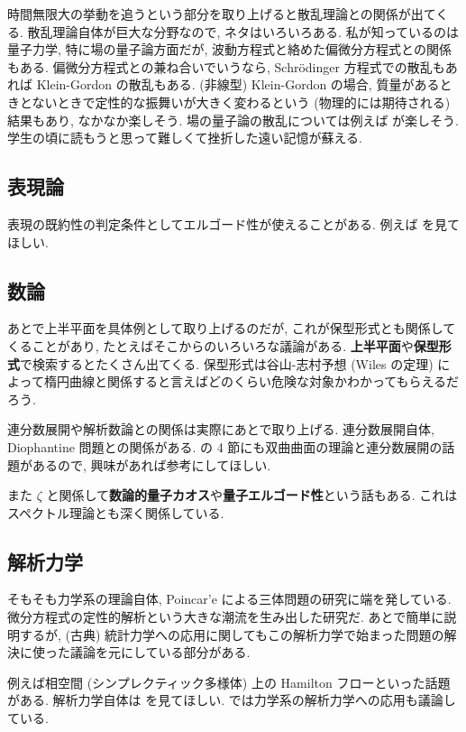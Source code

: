 \documentclass[openany, a4paper, oneside]{jsbook}
\begin{document}
時間無限大の挙動を追うという部分を取り上げると散乱理論との関係が出てくる.
散乱理論自体が巨大な分野なので, ネタはいろいろある.
私が知っているのは量子力学, 特に場の量子論方面だが, 波動方程式と絡めた偏微分方程式との関係もある.
偏微分方程式との兼ね合いでいうなら, Schr\"odinger 方程式での散乱もあれば Klein-Gordon の散乱もある.
(非線型) Klein-Gordon の場合, 質量があるときとないときで定性的な振舞いが大きく変わるという
(物理的には期待される) 結果もあり, なかなか楽しそう.
場の量子論の散乱については例えば \cite{WojciechDybalski1} が楽しそう.
学生の頃に読もうと思って難しくて挫折した遠い記憶が蘇える.
\subsection{表現論}

表現の既約性の判定条件としてエルゴード性が使えることがある.
例えば \cite[2.2 (c)]{KobayashiOshima1} を見てほしい.
\subsection{数論}

あとで上半平面を具体例として取り上げるのだが,
これが保型形式とも関係してくることがあり, たとえばそこからのいろいろな議論がある.
\textbf{上半平面}や\textbf{保型形式}で検索するとたくさん出てくる.
保型形式は谷山-志村予想 (Wiles の定理) によって楕円曲線と関係すると言えばどのくらい危険な対象かわかってもらえるだろう.

連分数展開や解析数論との関係は実際にあとで取り上げる.
連分数展開自体, Diophantine 問題との関係がある.
\cite{YasuykiNakamura1} の 4 節にも双曲曲面の理論と連分数展開の話題があるので,
興味があれば参考にしてほしい.

また $\zeta$ と関係して\textbf{数論的量子カオス}や\textbf{量子エルゴード性}という話もある.
これはスペクトル理論とも深く関係している.
\subsection{解析力学}

そもそも力学系の理論自体, Poincar'e による三体問題の研究に端を発している.
微分方程式の定性的解析という大きな潮流を生み出した研究だ.
あとで簡単に説明するが,
(古典) 統計力学への応用に関してもこの解析力学で始まった問題の解決に使った議論を元にしている部分がある.

例えば相空間 (シンプレクティック多様体) 上の Hamilton フローといった話題がある.
解析力学自体は \cite{KenjiFukaya1, NakamuraYamamoto1, NakamuraYamamoto2} を見てほしい.
\cite{NakamuraYamamoto1} では力学系の解析力学への応用も議論している.
\end{document}
